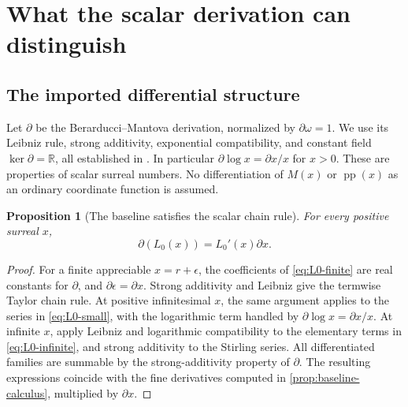 \documentclass[11pt,letterpaper]{article}
\numberwithin{equation}{section}
\theoremstyle{plain}
\newtheorem{proposition}[proposition]{Proposition}
\theoremstyle{definition}
\theoremstyle{remark}
\newcommand{\R}{\mathbb R}
\newcommand{\pp}{\operatorname{pp}}
\newcommand{\der}{\partial}
\begin{document}
\section{What the scalar derivation can distinguish}\label{sec:differential}

\subsection{The imported differential structure}
Let $\der$ be the Berarducci--Mantova derivation, normalized by
$\der\omega=1$. We use its Leibniz rule, strong additivity, exponential
compatibility, and constant field $\ker\der=\R$, all established in
\cite{BM}. In particular $\der\log x=\der x/x$ for $x>0$.
These are properties of scalar surreal numbers. No differentiation of
$M(x)$ or $\pp(x)$ as an ordinary coordinate function is assumed.

\begin{proposition}[The baseline satisfies the scalar chain rule]
\label{prop:BM-baseline}
For every positive surreal $x$,
\begin{equation}\label{eq:BM-chain0}
 \der(L_0(x))=L_0'(x)\der x.
\end{equation}
\end{proposition}
\begin{proof}
For a finite appreciable $x=r+\epsilon$, the coefficients of
\eqref{eq:L0-finite} are real constants for $\der$, and
$\der\epsilon=\der x$. Strong additivity and Leibniz give the
termwise Taylor chain rule. At positive infinitesimal $x$, the same argument
applies to the series in \eqref{eq:L0-small}, with the logarithmic term
handled by $\der\log x=\der x/x$. At infinite $x$, apply Leibniz and
logarithmic compatibility to the elementary terms in
\eqref{eq:L0-infinite}, and strong additivity to the Stirling series.
All differentiated families are summable by the strong-additivity property
of $\der$. The resulting expressions coincide with the fine derivatives
computed in \cref{prop:baseline-calculus}, multiplied by $\der x$.
\end{proof}
\end{document}
